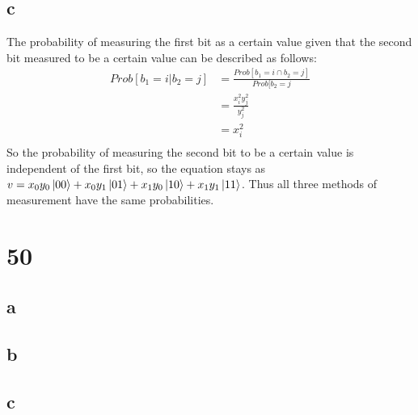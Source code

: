 \documentclass[letterpaper,notitlepage,twoside]{article}
\begin{document}
\subsection*{c}
The probability of measuring the first bit as a certain value given that the second bit measured to be a certain value can be described as follows:
\begin{align*}
Prob[b_1 = i | b_2 = j] &= \frac{Prob[b_1 = i \cap b_2 = j]}{Prob[b_2 = j} \\
&= \frac{x_i^2y_j^2}{y_j^2} \\
&= x_i^2 \\
\end{align*}
So the probability of measuring the second bit to be a certain value is independent of the first bit, so the equation stays as $v = x_0y_0\ket{00} + x_0y_1\ket{01} + x_1y_0\ket{10} + x_1y_1\ket{11}$. Thus all three methods of measurement have the same probabilities.
\section*{50}
\subsection*{a}

\subsection*{b}

\subsection*{c}
\end{document}
